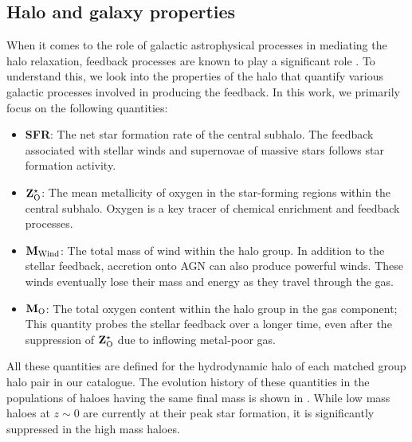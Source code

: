 \subsection{Halo and galaxy properties}
\label{sec:hal-gal-props}
When it comes to the role of galactic astrophysical processes in mediating the halo relaxation, feedback processes are known to play a significant role \cite{2011MNRAS.414..195T,2023Velmani&Paranjape}. To understand this, we look into the properties of the halo that quantify various galactic processes involved in producing the feedback. 
% 
% 
In this work, we primarily focus on the  following quantities: 
\begin{itemize}
    \item \textbf{SFR}: The net star formation rate of the central subhalo. The feedback associated with stellar winds and supernovae of massive stars follows star formation activity.
    \item $\mathbf{Z^{\star}_{\rm{O}}}$: The mean metallicity of oxygen in the star-forming regions within the central subhalo. Oxygen is a key tracer of chemical enrichment and feedback processes.
    \item $\mathbf{M_{\rm{Wind}}}$: The total mass of wind within the halo group. In addition to the stellar feedback, accretion onto AGN can also produce powerful winds. These winds eventually lose their mass and energy as they travel through the gas.
    \item $\mathbf{M_{\rm{O}}}$: The total oxygen content within the halo group in the gas component; This quantity probes the stellar feedback over a longer time, even after the suppression of $\mathbf{Z^{\star}_{\rm{O}}}$ due to inflowing metal-poor gas.
\end{itemize}
All these quantities are defined for the hydrodynamic halo of each matched group halo pair in our catalogue. The evolution history of these quantities in the populations of haloes having the same final mass is shown in . While low mass haloes at $z \sim 0$ are currently at their peak star formation, it is significantly suppressed in the high mass haloes.


